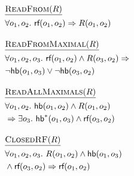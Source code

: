 \begin{align*}
  & \text{\underline{{\sc ReadFrom}$(R)$}} \\
  & \forall o_1,o_2.\ \textsf{rf}(o_1,o_2) \Rightarrow R(o_1,o_2)
  \\[1em]
  & \text{\underline{{\sc ReadFromMaximal}$(R)$}} \\
  & \forall o_1,o_2,o_3.\ \textsf{rf}(o_1,o_2) \land R(o_3,o_2) \Rightarrow \\
  & \lnot\textsf{hb}(o_1,o_3) \lor \lnot\textsf{hb}(o_3,o_2)
  \\[1em]
  & \text{\underline{{\sc ReadAllMaximals}$(R)$}} \\
  & \forall o_1,o_2.\ \textsf{hb}(o_1,o_2)\land R(o_1,o_2) \\
  & \Rightarrow \exists o_3.\ \textsf{hb}^*(o_1,o_3)\land  \textsf{rf}(o_3,o_2)
  \\[1em]
  & \text{\underline{{\sc ClosedRF}$(R)$}} \\
  & \forall o_1, o_2, o_3.\ R(o_1,o_2) \land \textsf{hb}(o_1,o_3) \\
  & \land \textsf{rf}(o_3,o_2) \Rightarrow \textsf{rf}(o_1,o_2)
\end{align*}
